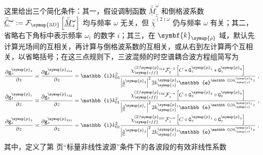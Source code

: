 这里给出三个简化条件\label{con:4}：其一，假设调制函数 $\bar{\bar{\underline{M}}}^{\omega}_z$ 和倒格波系数 $\bar{\bar{\underline{C}}}^{\omega} := \mathcal F_{\symup{3D}} \left[ \bar{\bar{\underline{M}}}^{\omega}_z \right]$ 均与频率 $\omega$ 无关，但 $\bar{\bar{\underline{\chi}}}^{(2)\omega}$ 仍与频率 $\omega$ 有关；其二，省略右下角标中表示频率 $\omega_i$ 的数字 $i$；其三，在 $\symbf{k}_{\symup{\rho}}$ 域，默认先计算光场间的互相关，再计算与倒格波系数的互相关，或从右到左计算两个互相关，以省略括号；在这三点规则下，三波混频的时空谱耦合波方程组简写为
\begin{subequations} \label{eq:2-210}
	\abovedisplayskip=13pt
	\belowdisplayskip=13pt
	\begin{align}
		\displaystyle{\frac{\partial {\mathtt{g}}^{\symup{p}_{3}}_{z}}{\partial z}} \asymp \displaystyle{\frac{\partial {\mathtt{g}}^{\symup{p}_{312}}_{z}}{\partial z}} &= \mathbb{i} k^{2}_{03} \frac{ \chi^{(2)\symup{p}_{312}}_{\symup{eff}} \mathcal F^{-1}_{z} \left[ C * {\mathtt{G}}^{\symup{p}_{1}}_{z} * {\mathtt{G}}^{\symup{p}_{2}}_{z} \right] }{ \left| \hat{\underline{g}}^{\symup{p}_{3}} \right|^2 2 k^{\symup{p}_{3}}_{\symup{z}} \mathbb{e}^{\mathbb{i} k^{\symup{p}_{3}}_{\symup{z}} z} } \label{eq:2-210a}~, \\ \displaystyle{\frac{\partial {\mathtt{g}}^{\symup{p}_{1}}_{z}}{\partial z}} \asymp \displaystyle{\frac{\partial {\mathtt{g}}^{\symup{p}_{132}}_{z}}{\partial z}} &= \mathbb{i} k^{2}_{01} \frac{ {\chi}^{(2)\symup{p}_{132}}_{\symup{eff}} \mathcal F^{-*}_{z} \left[ C \circ  {\mathtt{G}}^{{\symup{p}}_{2}}_{z} \circ {\mathtt{G}}^{{\symup{p}}_{3}}_{z} \right] }{ \left| \hat{\underline{g}}^{\symup{p}_{1}} \right|^2 2 k^{\symup{p}_{1}}_{\symup{z}} \mathbb{e}^{\mathbb{i} k^{\symup{p}_{1}}_{\symup{z}} z} } \label{eq:2-210b}~, \\ \displaystyle{\frac{\partial {\mathtt{g}}^{\symup{p}_{2}}_{z}}{\partial z}} \asymp \displaystyle{\frac{\partial {\mathtt{g}}^{\symup{p}_{231}}_{z}}{\partial z}} &= \mathbb{i} k^{2}_{02} \frac{ {\chi}^{(2)\symup{p}_{231}}_{\symup{eff}} \mathcal F^{-*}_{z} \left[ C \circ {\mathtt{G}}^{{\symup{p}}_{1}}_{z} \circ {\mathtt{G}}^{{\symup{p}}_{3}}_{z} \right] }{ \left| \hat{\underline{g}}^{\symup{p}_{2}} \right|^2 2 k^{\symup{p}_{2}}_{\symup{z}} \mathbb{e}^{\mathbb{i} k^{\symup{p}_{2}}_{\symup{z}} z} } \label{eq:2-210c}~,
	\end{align}
\end{subequations}
其中，定义了第 \pageref{con:3} 页“标量非线性波源”条件下的各波段的有效非线性系数

